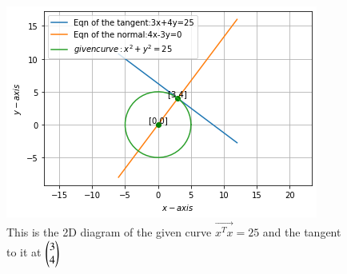 \begin{figure}[!]
 \begin{center}
  \includegraphics[width=\columnwidth]{solutions/3/2/1/a/assignment5_fig.png}
    \caption{This is the 2D diagram of the given curve  $\vec{x^Tx}=25$ and the tangent to it at $\begin{pmatrix}3\\4\end{pmatrix}$}
    \label{eq:solutions/3/2/1/a/myfig:1}
    \end{center}
\end{figure}
